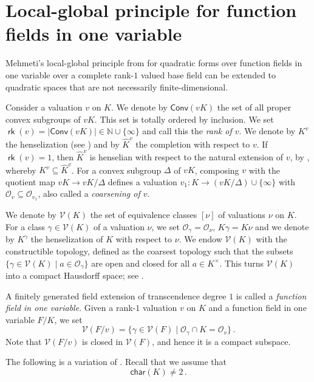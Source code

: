 \documentclass[twoside,11pt]{amsart}
\numberwithin{equation}{section}
\theoremstyle{definition}
\newcommand{\car}{\mathsf{char}}
\newcommand{\mg}[1]{{#1}^{\times}}
\newcommand{\nat}{\mathbb{N}}
\newcommand\rk{\operatorname{\mathsf{rk}}}
\newcommand{\mc}{\mathcal}
\begin{document}
\section{Local-global principle for function fields in one variable}


Mehmeti's local-global principle from \cite{Meh19} for quadratic forms over function fields in one variable over a
complete rank-$1$ valued base field can be extended to quadratic spaces that are not necessarily finite-dimensional. 

Consider a valuation $v$ on $K$.
We denote by $\mathsf{Conv}(vK)$ the set of all proper convex subgroups of $vK$.
This set is totally ordered by inclusion.
We set $\rk(v)=|\mathsf{Conv}(vK)|\in\nat\cup\{\infty\}$ and call this the \emph{rank of $v$}.
We denote by $K^v$ the henselization
(see \cite[Sect.~5.2]{EP05}) and by $\hat{K}^v$ the completion with respect to $v$.
If $\rk(v)=1$, then $\hat{K}^v$ is henselian with respect to the natural extension of $v$, by \cite[Theorem 1.3.1]{EP05}, whereby $K^v\subseteq\hat{K}^v$. 
For a convex subgroup $\Delta$ of $vK$, 
composing $v$ with the quotient map $vK \rightarrow vK/\Delta$ defines a valuation
$v_1 : K\rightarrow (vK/\Delta)\cup\{\infty\}$ with $\mc{O}_v \subseteq\mc{O}_{v_1}$, also called a \emph{coarsening of $v$}.


We denote by $\mc{V}(K)$ the set of equivalence classes $[\nu]$ of valuations $\nu$ on $K$.
For a class $\gamma\in\mc{V}(K)$ of a valuation $\nu$, we set $\mc{O}_\gamma=\mc{O}_\nu$, $K\gamma=K\nu$ and we denote by $K^\gamma$ the henselization of $K$ with respect to $\nu$.
We endow $\mc{V}(K)$ with the constructible topology, defined as the coarsest topology such that the subsets $\{\gamma\in\mc{V}(K)\mid a\in\mc{O}_\gamma\}$ are open and closed for all $a\in\mg{K}$.
This turns $\mc{V}(K)$ into
a compact Hausdorff space; see \cite[Sect.~1]{HK94}.

A finitely generated field extension of transcendence degree $1$ is called a \emph{function field in one variable}.
Given a rank-$1$ valuation $v$ on $K$ and a function field in one variable $F/K$, 
we set $$\mc{V}(F/v)=\{\gamma\in\mc{V}(F)\mid \mc{O}_\gamma\cap K=\mc{O}_v\}\,.$$
Note that $\mc{V}(F/v)$ is closed in $\mc{V}(F)$, and hence it is a compact subspace.






The following is a variation of \cite[Cor.~7.2]{BDD25}.
Recall that we assume that 
$$\car(K)\neq 2\,.$$
\end{document}
